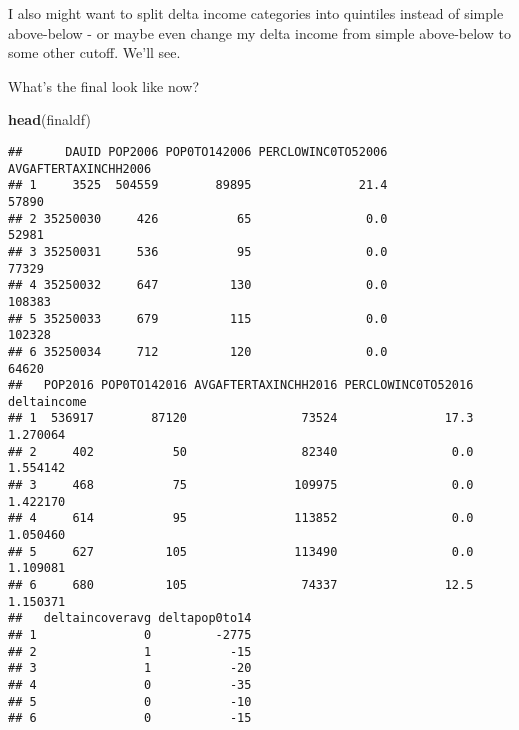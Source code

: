 \documentclass[]{article}
\newenvironment{Shaded}{\begin{snugshade}}{\end{snugshade}}
\newcommand{\CommentTok}[1]{\textcolor[rgb]{0.56,0.35,0.01}{\textit{#1}}}
\newcommand{\DecValTok}[1]{\textcolor[rgb]{0.00,0.00,0.81}{#1}}
\newcommand{\KeywordTok}[1]{\textcolor[rgb]{0.13,0.29,0.53}{\textbf{#1}}}
\newcommand{\NormalTok}[1]{#1}
\newcommand{\OperatorTok}[1]{\textcolor[rgb]{0.81,0.36,0.00}{\textbf{#1}}}
\newcommand{\StringTok}[1]{\textcolor[rgb]{0.31,0.60,0.02}{#1}}
\begin{document}
I also might want to split delta income categories into quintiles
instead of simple above-below - or maybe even change my delta income
from simple above-below to some other cutoff. We'll see.

\begin{Shaded}
\end{Shaded}

What's the final look like now?

\begin{Shaded}
\begin{Highlighting}[]
\KeywordTok{head}\NormalTok{(finaldf)}
\end{Highlighting}
\end{Shaded}

\begin{verbatim}
##      DAUID POP2006 POP0TO142006 PERCLOWINC0TO52006 AVGAFTERTAXINCHH2006
## 1     3525  504559        89895               21.4                57890
## 2 35250030     426           65                0.0                52981
## 3 35250031     536           95                0.0                77329
## 4 35250032     647          130                0.0               108383
## 5 35250033     679          115                0.0               102328
## 6 35250034     712          120                0.0                64620
##   POP2016 POP0TO142016 AVGAFTERTAXINCHH2016 PERCLOWINC0TO52016 deltaincome
## 1  536917        87120                73524               17.3    1.270064
## 2     402           50                82340                0.0    1.554142
## 3     468           75               109975                0.0    1.422170
## 4     614           95               113852                0.0    1.050460
## 5     627          105               113490                0.0    1.109081
## 6     680          105                74337               12.5    1.150371
##   deltaincoveravg deltapop0to14
## 1               0         -2775
## 2               1           -15
## 3               1           -20
## 4               0           -35
## 5               0           -10
## 6               0           -15
\end{verbatim}
\end{document}
